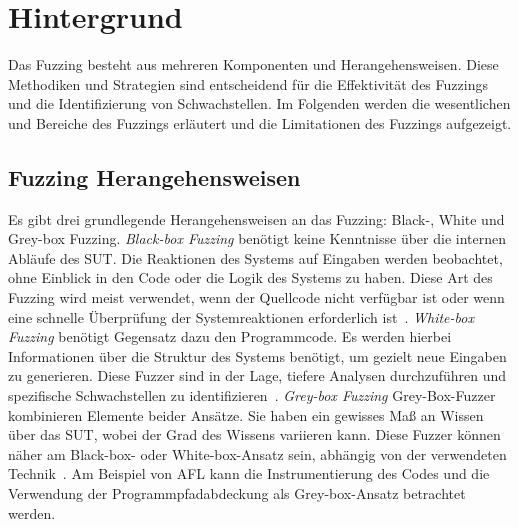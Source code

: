 
\section{Hintergrund}\label{sec:hintergrund}
Das Fuzzing besteht aus mehreren Komponenten und Herangehensweisen.
Diese Methodiken und Strategien sind entscheidend für die Effektivität des Fuzzings und die
Identifizierung von Schwachstellen.
Im Folgenden werden die wesentlichen und Bereiche des Fuzzings erläutert und die Limitationen des Fuzzings aufgezeigt.
\subsection{Fuzzing Herangehensweisen}\label{subsec:testing-methoden}
Es gibt drei grundlegende Herangehensweisen an das Fuzzing: Black-, White und Grey-box Fuzzing.\newline
\textit{ Black-box Fuzzing} benötigt keine Kenntnisse über die internen Abläufe des SUT\@.
Die Reaktionen des Systems auf Eingaben werden beobachtet, ohne Einblick in den Code oder die Logik des Systems zu haben.
Diese Art des Fuzzing wird meist verwendet, wenn der Quellcode nicht verfügbar ist oder wenn eine schnelle Überprüfung der
Systemreaktionen erforderlich ist~\cite{eceiza_improving_2023}.\newline
\textit{ White-box Fuzzing} benötigt Gegensatz dazu den Programmcode.
Es werden hierbei Informationen über die Struktur des Systems benötigt, um gezielt neue Eingaben zu generieren.
Diese Fuzzer sind in der Lage, tiefere Analysen durchzuführen und spezifische Schwachstellen zu identifizieren~\cite{eceiza_improving_2023}.\newline
\textit{ Grey-box Fuzzing}
Grey-Box-Fuzzer kombinieren Elemente beider Ansätze.
Sie haben ein gewisses Maß an Wissen über das SUT, wobei der Grad des Wissens variieren kann.
Diese Fuzzer können näher am Black-box- oder White-box-Ansatz sein, abhängig von der verwendeten Technik~\cite{fuzzing_methods}.
Am Beispiel von AFL kann die Instrumentierung des Codes und die Verwendung der Programmpfadabdeckung als Grey-box-Ansatz
betrachtet werden.
